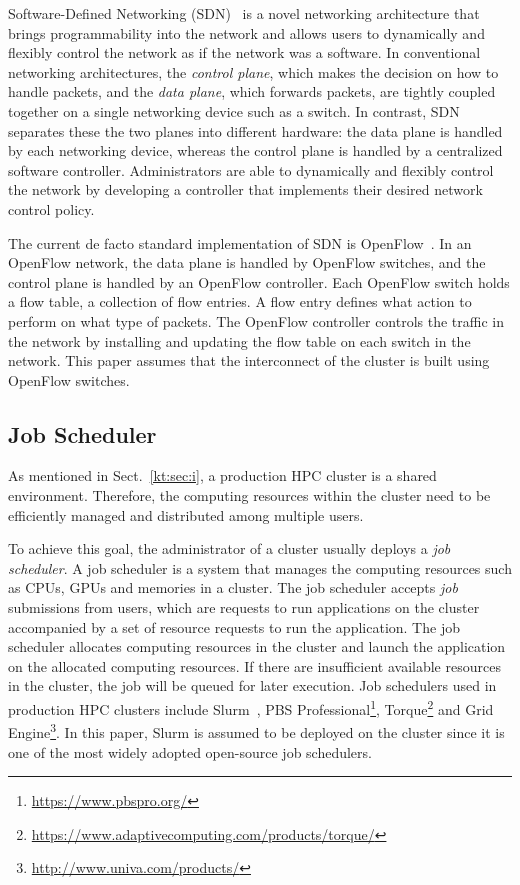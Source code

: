 \documentclass[graybox]{svmult}
\begin{document}
Software-Defined Networking (SDN)~\cite{Jamalian2015} is a novel networking
architecture that brings programmability into the network and allows users to
dynamically and flexibly control the network as if the network was a software.
In conventional networking architectures, the \textit{control plane}, which
makes the decision on how to handle packets, and the \textit {data plane},
which forwards packets, are tightly coupled together on a single networking
device such as a switch. In contrast, SDN separates these the two planes into
different hardware: the data plane is handled by each networking device,
whereas the control plane is handled by a centralized software controller.
Administrators are able to dynamically and flexibly control the network by
developing a controller that implements their desired network control policy.

The current de facto standard implementation of SDN is
OpenFlow~\cite{McKeown2008}. In an OpenFlow network, the data plane is handled
by OpenFlow switches, and the control plane is handled by an OpenFlow
controller. Each OpenFlow switch holds a flow table, a collection of flow
entries. A flow entry defines what action to perform on what type of packets.
The OpenFlow controller controls the traffic in the network by installing and
updating the flow table on each switch in the network. This paper assumes that
the interconnect of the cluster is built using OpenFlow switches.

\subsection{Job Scheduler}\label{kt:sec:ii-jms}

As mentioned in Sect.~\ref{kt:sec:i}, a production HPC cluster is a shared
environment. Therefore, the computing resources within the cluster need to be
efficiently managed and distributed among multiple users.

To achieve this goal, the administrator of a cluster usually deploys a
\textit{job scheduler}. A job scheduler is a system that manages the computing
resources such as CPUs, GPUs and memories in a cluster. The job scheduler
accepts \textit{job} submissions from users, which are requests to run
applications on the cluster accompanied by a set of resource requests to run
the application. The job scheduler allocates computing resources in the
cluster and launch the application on the allocated computing resources. If
there are insufficient available resources in the cluster, the job will be
queued for later execution. Job schedulers used in production HPC clusters
include Slurm~\cite{Yoo2003}, PBS
Professional\footnote{\url{https://www.pbspro.org/}},
Torque\footnote{\url{https://www.adaptivecomputing.com/products/torque/}} and
Grid Engine\footnote{\url{http://www.univa.com/products/}}. In this paper,
Slurm is assumed to be deployed on the cluster since it is one of the most
widely adopted open-source job schedulers.
\end{document}
